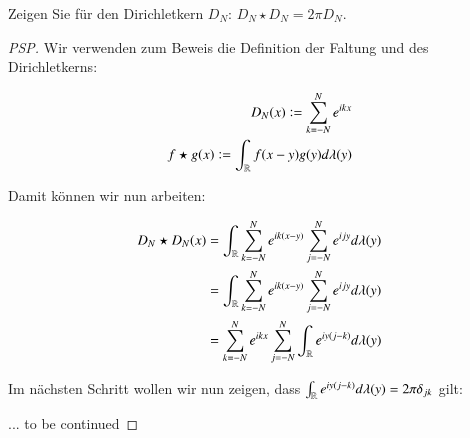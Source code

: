 
\begin{exercise}
	Zeigen Sie für den Dirichletkern $D_N$: $D_N \star D_N = 2\pi D_N$.
\end{exercise}

\begin{proof}[PSP]
	Wir verwenden zum Beweis die Definition der Faltung und des Dirichletkerns:
	
	\begin{eqnarray*}
	D_N(x) := \sum_{k=-N}^N e^{ikx} \\
	f \star g(x) := \int_{\mathbb{R} } f(x-y) g(y) d\lambda (y)
	\end{eqnarray*}

Damit können wir nun arbeiten:

\begin{equation*}
\begin{split}
D_N \star D_N(x) & = \int_{\mathbb{R}} \sum_{k=-N}^{N} e^{ik(x-y)} \sum_{j=-N}^{N} e^{ijy} d\lambda (y) \\
& = \int_{\mathbb{R}} \sum_{k=-N}^{N} e^{ik(x-y)} \sum_{j=-N}^{N} e^{ijy} d\lambda (y) \\
& = \sum_{k=-N}^{N} e^{ikx} \sum_{j=-N}^{N} \int_{\mathbb{R}} e^{iy(j-k)} d\lambda (y) \\
\end{split}
\end{equation*}

Im nächsten Schritt wollen wir nun zeigen, dass $\int_{\mathbb{R}} e^{iy(j-k)} d\lambda (y) = 2\pi \delta_{jk}$ gilt:

... to be continued
\end{proof}
